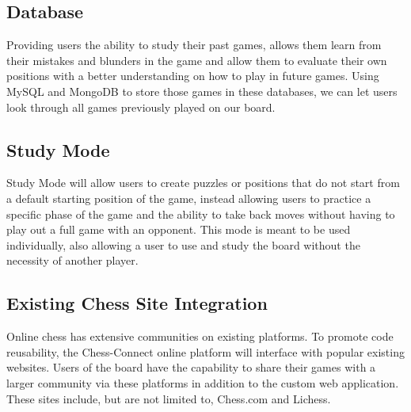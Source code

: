 \documentclass{article}
\begin{document}
\subsection{Database}
{Providing users the ability to study their past games, allows them learn from their mistakes and blunders in the game and allow them to evaluate their own positions with a better understanding on how to play in future games. Using MySQL and MongoDB to store those games in these databases, we can let users look through all games previously played on our board.}

\subsection{Study Mode}
{Study Mode will allow users to create puzzles or positions that do not start from a default starting position of the game, instead allowing users to practice a specific phase of the game and the ability to take back moves without having to play out a full game with an opponent. This mode is meant to be used individually, also allowing a user to use and study the board without the necessity of another player.}

\subsection{Existing Chess Site Integration}
{Online chess has extensive communities on existing platforms. To promote code reusability, the Chess-Connect online platform will interface with popular existing websites.
Users of the board have the capability to share their games with a larger community via these platforms in addition to the custom web application. These sites include, but are not limited to, Chess.com and Lichess.}
\end{document}
